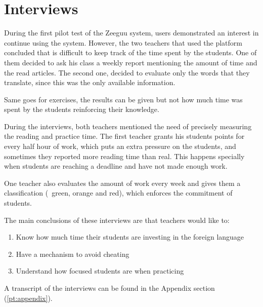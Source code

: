 \section{Interviews}\label{p02:interviews}

During the first pilot test of the Zeeguu system, users demonstrated an interest in continue using the system. However, the two teachers that used the platform concluded that is difficult to keep track of the time spent by the students. One of them decided to ask his class a weekly report mentioning the amount of time and the read articles. The second one, decided to evaluate only the words that they translate, since this was the only available information.

Same goes for exercises, the results can be given but not how much time was spent by the students reinforcing their knowledge.

During the interviews, both teachers mentioned the need of precisely measuring the reading and practice time. The first teacher grants his students points for every half hour of work, which puts an extra pressure on the students, and sometimes they reported more reading time than real. This happens specially when students are reaching a deadline and have not made enough work. 

One teacher also evaluates the amount of work every week and gives them a classification (\Ie\ green, orange and red), which enforces the commitment of students.

The main conclusions of these interviews are that teachers would like to:
\begin{enumerate}
	\item Know how much time their students are investing in the foreign language
	\item Have a mechanism to avoid cheating
	\item Understand how focused students are when practicing
\end{enumerate}

A transcript of the interviews can be found in the Appendix section (\ref{pt:appendix}).